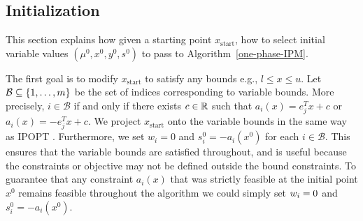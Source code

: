 \documentclass{article}
\begin{document}
\subsection{Initialization}\label{sec:initialization}


This section explains how given a starting point $x_{\text{start}}$, how to select initial variable values $(\mu^0,x^0, y^0, s^0)$ to pass to Algorithm~\ref{one-phase-IPM}.


The first goal is to modify $x_{\text{start}}$ to satisfy any bounds e.g., $l \le x \le u$. Let $\mathcal{B} \subseteq \{ 1, \dots, m \}$ be the set of indices corresponding to variable bounds. More precisely, $i \in \mathcal{B}$ if and only if there exists $c \in \mathbb{R}$ such that $a_i(x) = e_j^T x + c$ or $a_i(x) = -e_j^T x + c$. We project $x_{\text{start}}$ onto the variable bounds in the same way as IPOPT \cite[Section 3.7]{wachter2006implementation}. Furthermore, we set $w_i = 0$ and $s_i^{0} = -a_i(x^0)$ for each $i \in \mathcal{B}$. This ensures that the variable bounds are satisfied throughout, and is useful because the constraints or objective may not be defined outside the bound constraints. To guarantee that any constraint $a_i(x)$ that was strictly feasible at the initial point $x^{0}$ remains feasible throughout the algorithm we could simply set $w_i = 0$ and $s_i^{0} = -a_i(x^0)$.
 



\end{document}
